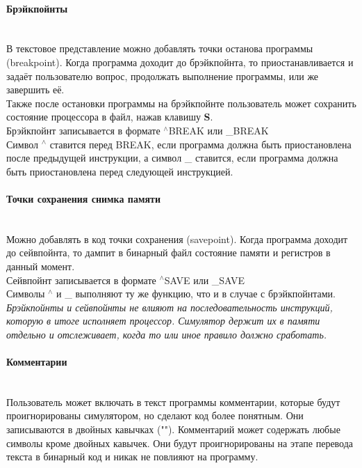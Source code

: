 \paragraph{Брэйкпойнты}~\\
В текстовое представление можно добавлять точки останова программы (breakpoint). Когда программа доходит до брэйкпойнта, то приостанавливается и задаёт пользователю вопрос, продолжать выполнение программы, или же завершить её.\\
Также после остановки программы на брэйкпойнте пользователь может сохранить состояние процессора в файл, нажав клавишу \textbf{S}. \\
Брэйкпойнт записывается в формате $^\wedge$BREAK или \_BREAK \\
Символ $^\wedge$ ставится перед BREAK, если программа должна быть приостановлена после предыдущей инструкции, а символ \_ ставится, если программа должна быть приостановлена перед следующей инструкцией.

\paragraph{Точки сохранения снимка памяти}~\\
Можно добавлять в код точки сохранения (savepoint). Когда программа доходит до сейвпойнта, то дампит в бинарный файл состояние памяти и регистров в данный момент.\\
Сейвпойнт записывается в формате $^\wedge$SAVE или \_SAVE \\
Символы $^\wedge$ и \_ выполняют ту же функцию, что и в случае с брэйкпойнтами. \\

{ \it \large
Брэйкпойнты и сейвпойнты не влияют на последовательность инструкций, которую в итоге исполняет процессор. Симулятор держит их в памяти отдельно и отслеживает, когда то или иное правило должно сработать.
}
\\

\paragraph{Комментарии}~\\
Пользователь может включать в текст программы комментарии, которые будут проигнорированы симулятором, но сделают код более понятным. Они записываются в двойных кавычках ("\space"). Комментарий может содержать любые символы кроме двойных кавычек.
Они будут проигнорированы на этапе перевода текста в бинарный код и никак не повлияют на программу.



